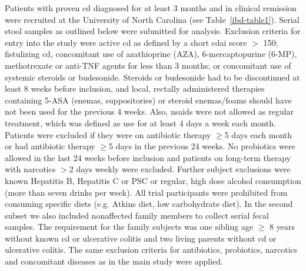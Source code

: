 Patients with proven \gls{cd} diagnosed for at least 3 months and in clinical 
remission were recruited at the University of North Carolina (see 
Table~\ref{ibd-table1}). Serial stool samples as outlined below were submitted 
for analysis. Exclusion criteria for entry into the study were active \gls{cd} 
as defined by a short \gls{cdai} score $>$ 150; fistulizing \gls{cd}, 
concomitant use of azathioprine (AZA), 6-mercaptopurine (6-MP), methotrexate or 
anti-TNF agents for less than 3 months; or concomitant use of systemic steroids 
or budesonide. Steroids or budesonide had to be discontinued at least 8 weeks 
before inclusion, and local, rectally administered therapies containing 5-ASA 
(enemas, suppositories) or steroid enemas/foams should have not been used for 
the previous 4 weeks. Also, \glspl{nsaid} were not allowed as regular 
treatment, which was defined as use for at least 4 days a week each month.  
Patients were excluded if they were on antibiotic therapy $\geq$5 days each 
month or had antibiotic therapy $\geq$5 days in the previous 24 weeks. No 
probiotics were allowed in the last 24 weeks before inclusion and patients on 
long-term therapy with narcotics $>$2 days weekly were excluded.  Further 
subject exclusions were known Hepatitis B, Hepatitis C or PSC or regular, high 
dose alcohol consumption (more than seven drinks per week). All trial 
participants were prohibited from consuming specific diets (e.g. Atkins diet, 
low carbohydrate diet). In the second subset we also included nonaffected 
family members to collect serial fecal samples.  The requirement for the family 
subjects was one sibling age $\geq$ 8 years without known \gls{cd} or 
ulcerative colitis and two living parents without \gls{cd} or ulcerative 
colitis. The same exclusion criteria for antibiotics, probiotics, narcotics and 
concomitant diseases as in the main study were applied. 

